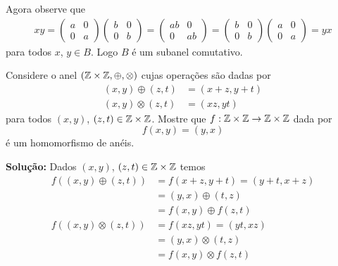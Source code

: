 \documentclass[12pt]{article}
\begin{document}
Agora observe que
\begin{align*}
	xy = \begin{pmatrix}
		a & 0\\0 & a
	\end{pmatrix}\begin{pmatrix}
		b & 0\\0 & b
	\end{pmatrix} = \begin{pmatrix}
		ab & 0\\0 & ab
	\end{pmatrix} = \begin{pmatrix}
		b & 0\\0 & b
	\end{pmatrix}\begin{pmatrix}
		a & 0\\0 & a
	\end{pmatrix} = yx
\end{align*}
para todos $x$, $y \in B$. Logo $B$ é um subanel comutativo.


\vspace{.5cm}

\questao Considere o anel $(\mathbb{Z} \times \mathbb{Z}, \oplus, \otimes)$ cujas operações são dadas por
\begin{align*}
	(x, y) \oplus (z, t) &= (x + z, y + t)\\
	(x, y) \otimes (z, t) &= (xz, yt)
\end{align*}
para todos $(x, y)$, $(z, t) \in \mathbb{Z} \times \mathbb{Z}$. Mostre que $f : \mathbb{Z} \times \mathbb{Z} \to \mathbb{Z} \times \mathbb{Z}$ dada por
\[
	f(x, y) = (y, x)
\]
é um homomorfismo de anéis.

\noindent\textbf{Solu\c{c}\~ao:} Dados $(x, y)$, $(z, t) \in \mathbb{Z} \times \mathbb{Z}$ temos
\begin{align*}
	f((x, y) \oplus (z, t)) &= f(x + z, y + t) = (y + t, x + z) \\ &= (y, x) \oplus (t, z) \\ &= f(x, y) \oplus f(z, t)\\
	f((x, y) \otimes (z, t)) &= f(xz, yt) = (yt, xz) \\ &= (y, x) \otimes (t, z) \\ &= f(x, y) \otimes f(z, t)\\
\end{align*}
\end{document}
